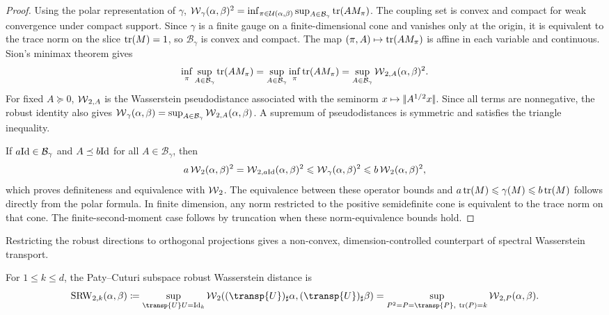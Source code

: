 \begin{proof}
	Using the polar representation of $\gamma$,
	$\operatorname{\mathcal{W}}_\gamma(\alpha,\beta)^2 = \inf_{\pi\in\mathcal{U}(\alpha,\beta)} \sup_{A\in\mathcal B_\gamma}\operatorname{tr}(AM_\pi)$.
	The coupling set is convex and compact for weak convergence under compact support. Since $\gamma$ is a finite gauge on a finite-dimensional cone and vanishes only at the origin, it is equivalent to the trace norm on the slice $\operatorname{tr}(M)=1$, so $\mathcal B_\gamma$ is convex and compact. The map $(\pi,A)\mapsto\operatorname{tr}(AM_\pi)$ is affine in each variable and continuous. Sion's minimax theorem gives
	\[
		\inf_\pi\sup_{A\in\mathcal B_\gamma}\operatorname{tr}(AM_\pi)
		=
		\sup_{A\in\mathcal B_\gamma}\inf_\pi\operatorname{tr}(AM_\pi)
		=
		\sup_{A\in\mathcal B_\gamma}\operatorname{\mathcal{W}}_{2,A}(\alpha,\beta)^2.
	\]
	For fixed $A\succeq0$, $\operatorname{\mathcal{W}}_{2,A}$ is the Wasserstein pseudodistance associated with the seminorm $x\mapsto|\!| A^{1/2}x |\!|$. Since all terms are nonnegative, the robust identity also gives
	$\operatorname{\mathcal{W}}_\gamma(\alpha,\beta) = \sup_{A\in\mathcal B_\gamma}\operatorname{\mathcal{W}}_{2,A}(\alpha,\beta)$.
	A supremum of pseudodistances is symmetric and satisfies the triangle inequality.

	If $a\mathrm{Id}\in\mathcal B_\gamma$ and $A\preceq b\mathrm{Id}$ for all $A\in\mathcal B_\gamma$, then
	\[
		a\operatorname{\mathcal{W}}_2(\alpha,\beta)^2
		=
		\operatorname{\mathcal{W}}_{2,a\mathrm{Id}}(\alpha,\beta)^2
		\leqslant
		\operatorname{\mathcal{W}}_\gamma(\alpha,\beta)^2
		\leqslant
		b\operatorname{\mathcal{W}}_2(\alpha,\beta)^2,
	\]
	which proves definiteness and equivalence with $\operatorname{\mathcal{W}}_2$. The equivalence between these operator bounds and $a\operatorname{tr}(M)\leqslant\gamma(M)\leqslant b\operatorname{tr}(M)$ follows directly from the polar formula. In finite dimension, any norm restricted to the positive semidefinite cone is equivalent to the trace norm on that cone. The finite-second-moment case follows by truncation when these norm-equivalence bounds hold.
\end{proof}

Restricting the robust directions to orthogonal projections gives a non-convex, dimension-controlled counterpart of spectral Wasserstein transport.

\begin{defn}\label{def-subspace-robust-wasserstein}
	For $1\leq k\leq d$, the Paty--Cuturi subspace robust Wasserstein distance is
	\[
		\SRW_{2,k}(\alpha,\beta)
		\eqdef
		\sup_{\transp{U}U=\Id_k}
		\Wass_2((\transp{U})_\sharp\alpha,(\transp{U})_\sharp\beta)
		=
		\sup_{P^2=P=\transp{P},\ \tr(P)=k}\Wass_{2,P}(\alpha,\beta).
	\]
\end{defn}

